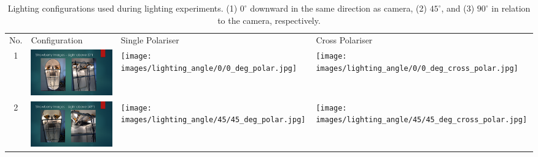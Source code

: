 \documentclass[fleqn,twoside,12pt]{report}
\begin{document}
\begin{table}[h]
	
	\caption{Lighting configurations used during lighting experiments. (1) $0^{\circ}$ downward in the same direction as camera, (2) 
		$45^{\circ}$, and (3) $90^{\circ}$ in relation to the camera, respectively.}
	\label{tab:lighting_orientation}
	\begin{tabular}{c*3{I}}
		\centering
		No. & Configuration & Single Polariser & Cross Polariser \\
		
		1 &
		\includegraphics[width=\linewidth]{images/lighting_angle/0/0_degrees_setup.pdf} & \texttt{[image: images/lighting\_angle/0/0\_deg\_polar.jpg]} & \texttt{[image: images/lighting\_angle/0/0\_deg\_cross\_polar.jpg]} \\
		
		2 &
		\includegraphics[width=\linewidth]{images/lighting_angle/45/45_degrees_setup.pdf} & \texttt{[image: images/lighting\_angle/45/45\_deg\_polar.jpg]} & \texttt{[image: images/lighting\_angle/45/45\_deg\_cross\_polar.jpg]} \\
		

\end{tabular}
\end{table}
\end{document}
